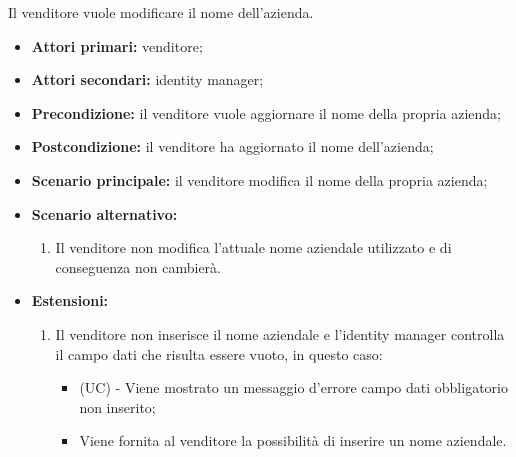 Il venditore vuole modificare il nome dell'azienda.
\begin{itemize}
	\item \textbf{Attori primari:} venditore;
	\item \textbf{Attori secondari:} identity manager;
	\item \textbf{Precondizione:} il venditore vuole aggiornare il nome della propria azienda;
	\item \textbf{Postcondizione:} il venditore ha aggiornato il nome dell'azienda;
	\item \textbf{Scenario principale:} il venditore modifica il nome della propria azienda;
	\item \textbf{Scenario alternativo:}
	\begin{enumerate}[label=\lett]
		\item Il venditore non modifica l'attuale nome aziendale utilizzato e di conseguenza non cambierà.
	\end{enumerate}
	\item \textbf{Estensioni:}
	\begin{enumerate}[label=\lett]
		\item Il venditore non inserisce il nome aziendale e l'identity manager controlla il campo dati che risulta essere vuoto, in questo caso:
		\begin{itemize}
			\item (UC) - Viene mostrato un messaggio d'errore campo dati obbligatorio non inserito;
			\item Viene fornita al venditore la possibilità di inserire un nome aziendale.
		\end{itemize}
	\end{enumerate} 
\end{itemize}

